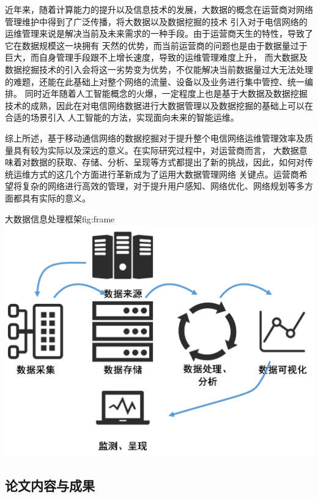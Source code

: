 \documentclass{HustGraduPaper}
\begin{document}
    近年来，随着计算能力的提升以及信息技术的发展，大数据的概念在运营商对网络管理维护中得到了广泛传播，将大数据以及数据挖掘的技术
    引入对于电信网络的运维管理来说是解决当前及未来需求的一种手段。由于运营商天生的特性，导致了它在数据规模这一块拥有
    天然的优势，而当前运营商的问题也是由于数据量过于巨大，而自身管理手段跟不上增长速度，导致的运维管理难度上升，
    而大数据及数据挖掘技术的引入会将这一劣势变为优势，不仅能解决当前数据量过大无法处理的难题，还能在此基础上对整个网络的流量、设备以及业务进行集中管控、统一编排。
    同时近年随着人工智能概念的火爆，一定程度上也是基于大数据及数据挖掘技术的成熟，因此在对电信网络数据进行大数据管理以及数据挖掘的基础上可以在合适的场景引入
    人工智能的方法，实现面向未来的智能运维。
    
    综上所述，基于移动通信网络的数据挖掘对于提升整个电信网络运维管理效率及质量具有较为实际以及深远的意义。在实际研究过程中，对运营商而言，
    大数据意味着对数据的获取、存储、分析、呈现等方式都提出了新的挑战，因此，如何对传统运维方式的这几个方面进行革新成为了运用大数据管理网络
    关键点。运营商希望将复杂的网络进行高效的管理，对于提升用户感知、网络优化、网络规划等多方面都具有实际的意义。\\
    \begin{generalfig}[htb]{大数据信息处理框架}{fig:frame}
		\includegraphics[width=\textwidth,scale = 0.5]{Figures/frame.png}
	\end{generalfig}

    \subsection{论文内容与成果}
\end{document}

